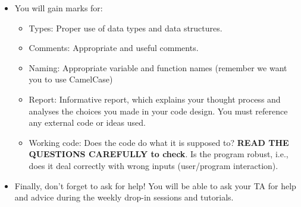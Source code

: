\documentclass[11pt]{report}
\begin{document}
\begin{itemize}
	\item You will gain marks for: %
	\begin{itemize}
	    \item Types: Proper use of data types and data structures. 
	    \item Comments: Appropriate and useful comments. 
	    \item Naming: Appropriate variable and function names (remember we want you to use CamelCase)
	    \item Report: Informative report, which explains your thought process and analyses the choices you made in your code design. You must reference any external code or ideas used.
	    \item Working code: Does the code do what it is supposed to? {\bf READ THE QUESTIONS CAREFULLY to check}. Is the program robust, i.e., does it deal correctly with wrong inputs (user/program interaction).
	\end{itemize}
	
	\item Finally, don't forget to ask for help! You will be able to ask your TA for help and advice during the weekly drop-in sessions and tutorials. 
\end{itemize}

    
\newpage
\end{document}
